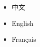 \documentclass[nofonts]{ctexart}
\begin{document}
\begin{itemize}
	\item[\dag] 中文
	\item English
	\item Fran\c{c}ais
\end{itemize}
\end{document}
